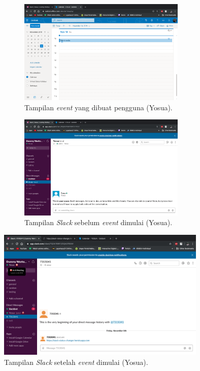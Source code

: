 \begin{figure}[h]
\begin{subfigure}{8.5cm}
  \centering
  \includegraphics[width=8cm]{./Gambar/PengujianYosua/Outlook.png}
  \caption{Tampilan \textit{event} yang dibuat pengguna (Yosua).}
  \label{fig:outlook_yosua}
\end{subfigure}
\begin{subfigure}{8.5cm}
  \centering
  \includegraphics[width=8cm]{./Gambar/PengujianYosua/Slack_Before.png}
  \caption{Tampilan \textit{Slack} sebelum \textit{event} dimulai (Yosua).}
  \label{fig:slack_before_yosua}
\end{subfigure}
\caption{}
\end{figure}

\begin{figure}[h]
  \includegraphics[width=10cm]{./Gambar/PengujianYosua/Slack_After.png}
  \centering
  \caption{Tampilan \textit{Slack} setelah \textit{event} dimulai (Yosua).}
  \label{fig:slack_after_yosua}
\end{figure}

